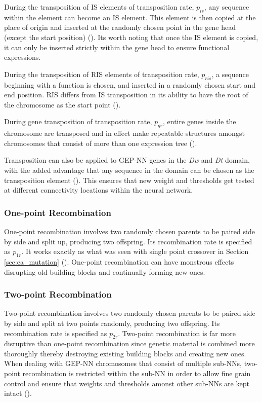 \noindent During the transposition of IS elements of transposition rate, \textit{$p_{is}$}, any sequence within the element can become an IS element. This element is then copied at the place of origin and inserted at the randomly chosen point in the gene head (except the start position) (\cite{ferreira2006gene}). Its worth noting that once the IS element is copied, it can only be inserted strictly within the gene head to ensure functional expressions. \bigskip

\noindent During the transposition of RIS elements of transposition rate, \textit{$p_{ris}$}, a sequence beginning with a function is chosen, and inserted in a randomly chosen start and end position. RIS differs from IS transposition in its ability to have the root of the chromosome as the start point (\Cite{ferreira2006gene}). \bigskip

\noindent During gene transposition of transposition rate, \textit{$p_{gr}$}, entire genes inside the chromosome are transposed and in effect make repeatable structures amongst chromosomes that consist of more than one expression tree (\cite{ferreira2006gene}). \bigskip

\noindent Transposition can also be applied to GEP-NN genes in the \textit{Dw} and \textit{Dt} domain, with the added advantage that any sequence in the domain can be chosen as the transposition element (\cite{ferreira2006gene}). This ensures that new weight and thresholds get tested at different connectivity locations within the neural network.

\subsubsection{One-point Recombination}
One-point recombination involves two randomly chosen parents to be paired side by side and split up, producing two offspring. Its recombination rate is specified as \textit{$p_{1r}$}. It works exactly as what was seen with single point crossover in Section \ref{sec:ea_mutation} (\cite{ferreira2006gene}). One-point recombination can have monstrous effects disrupting old building blocks and continually forming new ones.

\subsubsection{Two-point Recombination}
Two-point recombination involves two randomly chosen parents to be paired side by side and split at two points randomly, producing two offspring. Its recombination rate is specified as \textit{$p_{2r}$}. Two-point recombination is far more disruptive than one-point recombination since genetic material is combined more thoroughly thereby destroying existing building blocks and creating new ones. When dealing with GEP-NN chromosomes that consist of multiple sub-NNs, two-point recombination is restricted within the sub-NN in order to allow fine grain control and ensure that weights and thresholds amonst other sub-NNs are kept intact (\cite{ferreira2006gene}).

